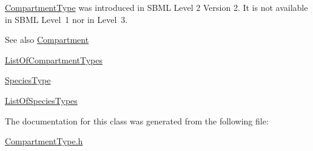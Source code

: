\hyperlink{class_compartment_type}{Compartment\+Type} was introduced in S\+B\+ML Level 2 Version 2. It is not available in S\+B\+ML Level~1 nor in Level~3.

\begin{DoxySeeAlso}{See also}
\hyperlink{class_compartment}{Compartment} 

\hyperlink{class_list_of_compartment_types}{List\+Of\+Compartment\+Types} 

\hyperlink{class_species_type}{Species\+Type} 

\hyperlink{class_list_of_species_types}{List\+Of\+Species\+Types} 
\end{DoxySeeAlso}


The documentation for this class was generated from the following file\+:\begin{DoxyCompactItemize}
\item 
\hyperlink{_compartment_type_8h}{Compartment\+Type.\+h}\end{DoxyCompactItemize}

